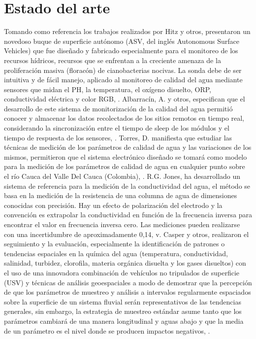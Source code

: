 \section{Estado del arte}
Tomando como referencia los trabajos realizados por Hitz y otros, presentaron un novedoso buque de superficie autónomo (ASV, del ingl\'es Autonomous Surface Vehicles) que fue dise\~nado y fabricado especialmente para el monitoreo de los recursos h\'idricos, recursos que se enfrentan a la creciente amenaza de la proliferaci\'on masiva (florac\'on) de cianobacterias nocivas. La sonda debe de ser intuitiva y de f\'acil manejo, aplicado al monitoreo de calidad del agua mediante sensores que midan el PH, la temperatura, el ox\'igeno disuelto,  ORP, conductividad el\'ectrica y color RGB, \cite{hitz2012design}. 
Albarrac\'in, A. y otros, especifican que el desarrollo de este sistema de monitorizaci\'on de la calidad del agua permiti\'o conocer y almacenar los datos recolectados de los sitios remotos en tiempo real, considerando la sincronizaci\'on entre el tiempo de sleep de los m\'odulos y el tiempo de respuesta de los sensores, \cite{samaniegodevelopment}. 
Torres, D. manifiesta que estudiar las t\'ecnicas de medici\'on de los par\'ametros de calidad de agua y las variaciones de los mismos, permitieron que el sistema electr\'onico dise\~nado se tomar\'a como modelo para la medici\'on de los par\'ametros de calidad de agua en cualquier punto sobre el río Cauca del Valle Del Cauca (Colombia), \cite{torres2009diseno}.
R.G. Jones, ha desarrollado un sistema de referencia para la medici\'on de la conductividad del agua, el m\'etodo se basa en la medici\'on de la resistencia de una columna de agua de dimensiones conocidas con precisión. Hay un efecto de polarización del electrodo y la convención es extrapolar la conductividad en funci\'on de la frecuencia inversa para encontrar el valor en frecuencia inversa cero. Las mediciones pueden realizarse con una incertidumbre de aproximadamente 0,14, \cite{jones2002measurements}v.
Casper y otros, realizaron el seguimiento y la evaluaci\'on, especialmente la identificaci\'on de patrones o tendencias espaciales en la qu\'imica del agua (temperatura, conductividad, salinidad, turbidez, clorofila, materia org\'anica disuelta y los gases disueltos) con el uso de una innovadora combinaci\'on de veh\'iculos no tripulados de superficie (USV) y t\'ecnicas de an\'alisis geoespaciales a modo de demostrar que la percepci\'on de que los par\'ametros de muestreo y an\'alisis a intervalos regularmente espaciados sobre la superficie de un sistema fluvial ser\'an representativos de las tendencias generales, sin embargo, la estrategia de muestreo est\'andar asume tanto que los par\'ametros cambiar\'a de una manera longitudinal y aguas abajo y que la media de un par\'ametro es el nivel donde se producen impactos negativos, \cite{casper2007combining}. 
